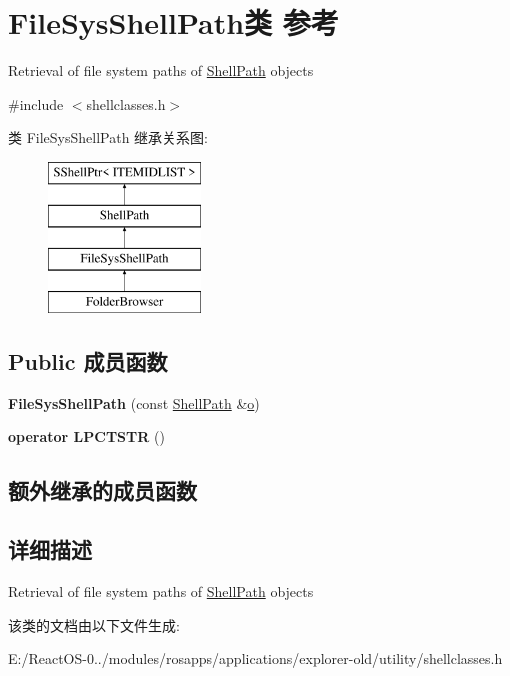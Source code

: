 \hypertarget{class_file_sys_shell_path}{}\section{File\+Sys\+Shell\+Path类 参考}
\label{class_file_sys_shell_path}


Retrieval of file system paths of \hyperlink{struct_shell_path}{Shell\+Path} objects  




{\ttfamily \#include $<$shellclasses.\+h$>$}

类 File\+Sys\+Shell\+Path 继承关系图\+:\begin{figure}[H]
\begin{center}
\leavevmode
\includegraphics[height=4.000000cm]{class_file_sys_shell_path}
\end{center}
\end{figure}
\subsection*{Public 成员函数}
\begin{DoxyCompactItemize}
\item 
\mbox{\label{class_file_sys_shell_path_a394441984be67dbd8d3ffd0316c49a27}} 
{\bfseries File\+Sys\+Shell\+Path} (const \hyperlink{struct_shell_path}{Shell\+Path} \&\hyperlink{opengl_2mesa_2main_2extensions_8c_ac02068cf344ef10efe2778c164d1233e}{o})
\item 
\mbox{\label{class_file_sys_shell_path_a156b31bbd51cc108f5c591a7ca22e4cc}} 
{\bfseries operator L\+P\+C\+T\+S\+TR} ()
\end{DoxyCompactItemize}
\subsection*{额外继承的成员函数}


\subsection{详细描述}
Retrieval of file system paths of \hyperlink{struct_shell_path}{Shell\+Path} objects 

该类的文档由以下文件生成\+:\begin{DoxyCompactItemize}
\item 
E\+:/\+React\+O\+S-\/0../modules/rosapps/applications/explorer-\/old/utility/shellclasses.\+h\end{DoxyCompactItemize}
